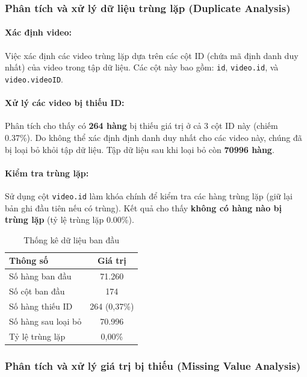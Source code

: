 \subsubsection{Phân tích và xử lý dữ liệu trùng lặp (Duplicate Analysis)}

\paragraph{Xác định video:} 
Việc xác định các video trùng lặp dựa trên các cột ID (chứa mã định danh duy nhất) của video trong tập dữ liệu. Các cột này bao gồm: \texttt{id}, \texttt{video.id}, và \texttt{video.videoID}.

\paragraph{Xử lý các video bị thiếu ID:}
Phân tích cho thấy có \textbf{264 hàng} bị thiếu giá trị ở cả 3 cột ID này (chiếm 0.37\%). Do không thể xác định định danh duy nhất cho các video này, chúng đã bị loại bỏ khỏi tập dữ liệu. Tập dữ liệu sau khi loại bỏ còn \textbf{70996 hàng}.

\paragraph{Kiểm tra trùng lặp:}
Sử dụng cột \texttt{video.id} làm khóa chính để kiểm tra các hàng trùng lặp (giữ lại bản ghi đầu tiên nếu có trùng). Kết quả cho thấy \textbf{không có hàng nào bị trùng lặp} (tỷ lệ trùng lặp 0.00\%).

\begin{table}[H]
\centering
\caption{Thống kê dữ liệu ban đầu}
\begin{tabular}{lc}
\toprule
\textbf{Thông số} & \textbf{Giá trị} \\
\midrule
Số hàng ban đầu & 71.260 \\
Số cột ban đầu & 174 \\
Số hàng thiếu ID & 264 (0,37\%) \\
Số hàng sau loại bỏ & 70.996 \\
Tỷ lệ trùng lặp & 0,00\% \\
\bottomrule
\end{tabular}
\end{table}

\subsubsection{Phân tích và xử lý giá trị bị thiếu (Missing Value Analysis)}

